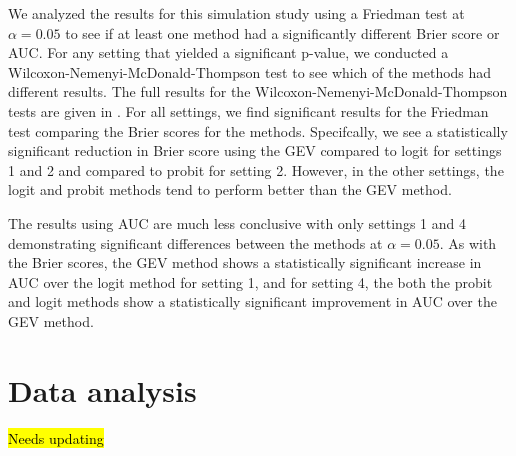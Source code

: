 \documentclass[11pt]{article}
\begin{document}
We analyzed the results for this simulation study using a Friedman test at $\alpha = 0.05$ to see if at least one method had a significantly different Brier score or AUC.
For any setting that yielded a significant p-value, we conducted a Wilcoxon-Nemenyi-McDonald-Thompson test to see which of the methods had different results.
The full results for the Wilcoxon-Nemenyi-McDonald-Thompson tests are given in .
For all settings, we find significant results for the Friedman test comparing the Brier scores for the methods.
Specifcally, we see a statistically significant reduction in Brier score using the GEV compared to logit for settings 1 and 2 and compared to probit for setting 2.
However, in the other settings, the logit and probit methods tend to perform better than the GEV method.

The results using AUC are much less conclusive with only settings 1 and 4 demonstrating significant differences between the methods at $\alpha = 0.05$.
As with the Brier scores, the GEV method shows a statistically significant increase in AUC over the logit method for setting 1, and for setting 4, the both the probit and logit methods show a statistically significant improvement in AUC over the GEV method.




\section{Data analysis}\label{rbs:analysis}
\hl{Needs updating}
\end{document}
